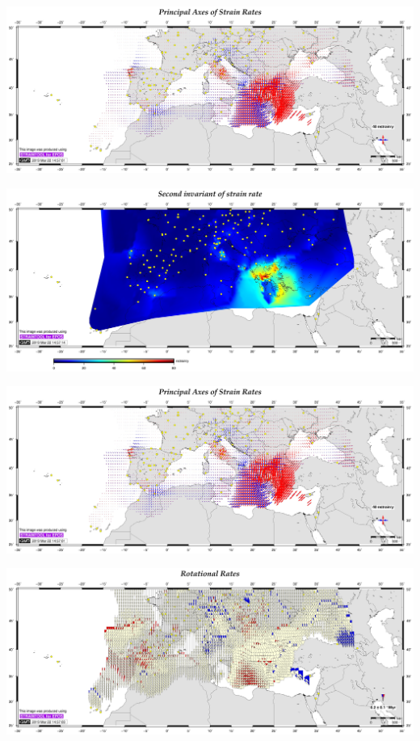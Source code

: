 \documentclass[landscape,a0paper,fontscale=0.340]{baposter} %
\begin{document}
\begin{poster}
{\begin{minipage}[b]{0.58\linewidth}
\begin{minipage}[t]{0.48\linewidth}
     \includegraphics[width=\textwidth]{e14s050506-output_str-S.jpg}
\end{minipage}\hfill
\begin{minipage}[t]{0.48\linewidth}
     \includegraphics[width=\textwidth]{e14s050506-output_2inv-S.jpg}

\end{minipage}



\end{minipage}\hfill
\begin{minipage}[b]{0.38\linewidth}
     \includegraphics[width=\textwidth]{e14s050506-output_str-S.jpg}
     
     \includegraphics[width=\textwidth]{e14s050506-output_rot-S.jpg}
     

\end{minipage}}
\end{poster}
\end{document}

